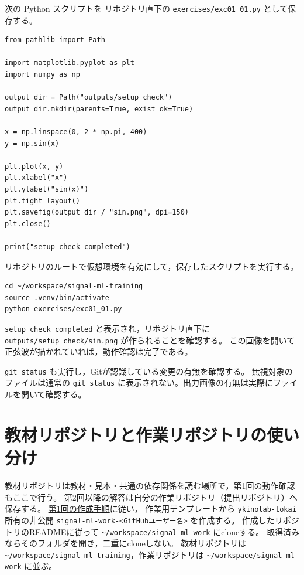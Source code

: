 次の Python スクリプトを
リポジトリ直下の \texttt{exercises/exc01\_01.py} として保存する。

\begin{lstlisting}[style=codecell]
from pathlib import Path

import matplotlib.pyplot as plt
import numpy as np

output_dir = Path("outputs/setup_check")
output_dir.mkdir(parents=True, exist_ok=True)

x = np.linspace(0, 2 * np.pi, 400)
y = np.sin(x)

plt.plot(x, y)
plt.xlabel("x")
plt.ylabel("sin(x)")
plt.tight_layout()
plt.savefig(output_dir / "sin.png", dpi=150)
plt.close()

print("setup check completed")
\end{lstlisting}

リポジトリのルートで仮想環境を有効にして，保存したスクリプトを実行する。

\begin{lstlisting}[style=codecell]
cd ~/workspace/signal-ml-training
source .venv/bin/activate
python exercises/exc01_01.py
\end{lstlisting}

\texttt{setup check completed} と表示され，リポジトリ直下に
\texttt{outputs/setup\_check/sin.png} が作られることを確認する。
この画像を開いて正弦波が描かれていれば，動作確認は完了である。

\texttt{git status} も実行し，Gitが認識している変更の有無を確認する。
無視対象のファイルは通常の \texttt{git status} に表示されない。出力画像の有無は実際にファイルを開いて確認する。

\hypertarget{ux6559ux6750repoux3068ux4f5cux696drepoux306eux4f7fux3044ux5206ux3051}{%
\section{教材リポジトリと作業リポジトリの使い分け}\label{ux6559ux6750repoux3068ux4f5cux696drepoux306eux4f7fux3044ux5206ux3051}}

教材リポジトリは教材・見本・共通の依存関係を読む場所で，第1回の動作確認もここで行う。
第2回以降の解答は自分の作業リポジトリ（提出リポジトリ）へ保存する。
\href{https://github.com/ykinolab-tokai/signal-ml-training/blob/main/handouts/01-environment-and-workflow.md\#自分用リポジトリの作成}{第1回の作成手順}に従い，
作業用テンプレートから \texttt{ykinolab-tokai} 所有の非公開
\texttt{signal-ml-work-\textless{}GitHubユーザー名\textgreater{}}
を作成する。 作成したリポジトリのREADMEに従って
\texttt{\textasciitilde{}/workspace/signal-ml-work} にcloneする。
取得済みならそのフォルダを開き，二重にcloneしない。 教材リポジトリは
\texttt{\textasciitilde{}/workspace/signal-ml-training}，作業リポジトリは
\texttt{\textasciitilde{}/workspace/signal-ml-work} に並ぶ。

